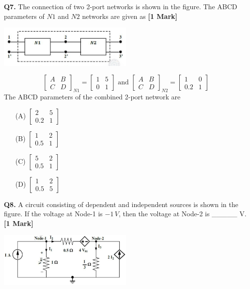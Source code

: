 \documentclass[11pt]{article}
\newcommand{\questiona}[2]{
    \noindent\textbf{Q#2.} #1 \hfill \textbf{[1 Mark]}
}
\begin{document}
\questiona{The connection of two 2-port networks is shown in the figure. The ABCD parameters of \( N1 \) and \( N2 \) networks are given as}{7}
\begin{center}
\includegraphics[width=0.5\textwidth]{figures/7.png}
\end{center}
\[
\begin{bmatrix} A & B \\ C & D \end{bmatrix}_{N1} = \begin{bmatrix} 1 & 5 \\ 0 & 1 \end{bmatrix}
\text{ and }
\begin{bmatrix} A & B \\ C & D \end{bmatrix}_{N2} = \begin{bmatrix} 1 & 0 \\ 0.2 & 1 \end{bmatrix}
\]
The ABCD parameters of the combined 2-port network are
\begin{enumerate}
    \item[(A)] \(\begin{bmatrix} 2 & 5 \\ 0.2 & 1 \end{bmatrix}\)
    \item[(B)] \(\begin{bmatrix} 1 & 2 \\ 0.5 & 1 \end{bmatrix}\)
    \item[(C)] \(\begin{bmatrix} 5 & 2 \\ 0.5 & 1 \end{bmatrix}\)
    \item[(D)] \(\begin{bmatrix} 1 & 2 \\ 0.5 & 5 \end{bmatrix}\)
\end{enumerate}
\vspace{0.5cm}

\questiona{A circuit consisting of dependent and independent sources is shown in the figure. If the voltage at Node-1 is \(-1 \, V\), then the voltage at Node-2 is \_\_\_\_\_ V.}{8}
\begin{center}
\includegraphics[width=0.5\textwidth]{figures/8.png}
\end{center}
\vspace{0.5cm}
\end{document}
